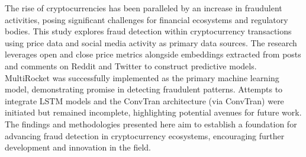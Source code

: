 The rise of cryptocurrencies has been paralleled by an increase in fraudulent activities, posing significant challenges for financial ecosystems and regulatory bodies. This study explores fraud detection within cryptocurrency transactions using price data and social media activity as primary data sources. The research leverages open and close price metrics alongside embeddings extracted from posts and comments on Reddit and Twitter to construct predictive models. MultiRocket was successfully implemented as the primary machine learning model, demonstrating promise in detecting fraudulent patterns. Attempts to integrate LSTM models and the ConvTran architecture (via ConvTran) were initiated but remained incomplete, highlighting potential avenues for future work. The findings and methodologies presented here aim to establish a foundation for advancing fraud detection in cryptocurrency ecosystems, encouraging further development and innovation in the field.
